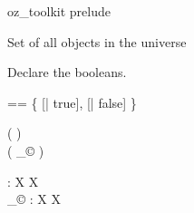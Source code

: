 \begin{zsection}
  \SECTION oz\_toolkit \parents prelude
\end{zsection}

Set of all objects in the universe

\begin{zed}
  [\oid]
\end{zed}

Declare the booleans.

\begin{zed}
  \bool == \{ [| true], [| false] \}
\end{zed}

\begin{zed}
   ( \poly \varg )\\
   ( \varg _{\copyright} )
\end{zed}

\begin{gendef}[X]
  \poly \varg : X \fun X\\
  \varg _{\copyright} : X \fun X
\end{gendef}
